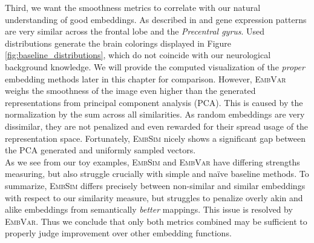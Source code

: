 \documentclass[]{article}
\begin{document}
Third, we want the smoothness metrics to correlate with our natural understanding of good embeddings. As described in \citet{ValkShapingBrainStructure2020} and \citet{Partel2020} gene expression patterns are very similar across the frontal lobe and the \textit{Precentral gyrus}. Used distributions generate the brain colorings displayed in Figure \ref{fig:baseline_distributions}, which do not coincide with our neurological background knowledge. We will provide the computed visualization of the \textit{proper} embedding methods later in this chapter for comparison. However, \textsc{EmbVar} weighs the smoothness of the image even higher than the generated representations from principal component analysis (PCA). This is caused by the normalization by the sum across all similarities. As random embeddings are very dissimilar, they are not penalized and even rewarded for their spread usage of the representation space. Fortunately, \textsc{EmbSim} nicely shows a significant gap between the PCA generated and uniformly sampled vectors.\\

As we see from our toy examples, \textsc{EmbSim} and \textsc{EmbVar} have differing strengths measuring, but also struggle crucially with simple and na\"ive baseline methods. To summarize, \textsc{EmbSim} differs precisely between non-similar and similar embeddings with respect to our similarity measure, but struggles to penalize overly akin and alike embeddings from semantically \textit{better} mappings. This issue is resolved by \textsc{EmbVar}. Thus we conclude that only both metrics combined may be sufficient to properly judge improvement over other embedding functions.
\end{document}
